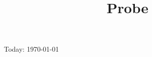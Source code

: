 \documentclass[11pt,aspectratio=169]{beamer}
\title{Probe}
\date{}
\begin{document}
\begin{frame}Today: \today\end{frame}
\end{document}
